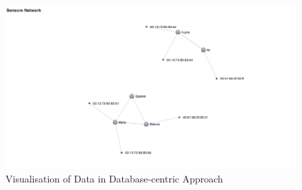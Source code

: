 \begin{appendices}
\begin{figure}[t]
  \begin{center}
    \includegraphics[width=1\textwidth]{images/screen-shot-social-sensing-network-data.pdf}
    \caption{Visualisation of Data in Database-centric Approach}
    \label{fig:screen-shot-social-sensing-network-data}
  \end{center}
\end{figure}

\end{appendices}